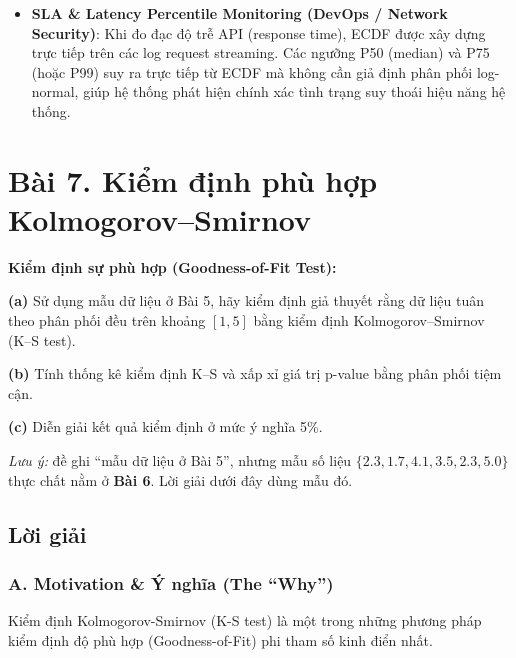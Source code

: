 \documentclass[12pt,a4paper]{article}
\renewenvironment{quote}{\begin{ghichu}}{\end{ghichu}}
\begin{document}
\begin{itemize}

\item
  \textbf{SLA \& Latency Percentile Monitoring (DevOps / Network Security)}: Khi đo đạc độ trễ API (response time), ECDF được xây dựng trực tiếp trên các log request streaming. Các ngưỡng P50 (median) và P75 (hoặc P99) suy ra trực tiếp từ ECDF mà không cần giả định phân phối log-normal, giúp hệ thống phát hiện chính xác tình trạng suy thoái hiệu năng hệ thống.
\end{itemize}

\section{Bài 7. Kiểm định phù hợp Kolmogorov--Smirnov}\label{buxe0i-7.-kiux1ec3m-ux111ux1ecbnh-phuxf9-hux1ee3p-kolmogorovsmirnov}

\begin{debai}

\textbf{Kiểm định sự phù hợp (Goodness-of-Fit Test):}

\textbf{(a)} Sử dụng mẫu dữ liệu ở Bài 5, hãy kiểm định giả thuyết rằng dữ liệu tuân theo phân phối đều trên khoảng \([1, 5]\) bằng kiểm định Kolmogorov--Smirnov (K--S test).

\textbf{(b)} Tính thống kê kiểm định K--S và xấp xỉ giá trị p-value bằng phân phối tiệm cận.

\textbf{(c)} Diễn giải kết quả kiểm định ở mức ý nghĩa 5\%.

\begin{quote}
\emph{Lưu ý:} đề ghi ``mẫu dữ liệu ở Bài 5'', nhưng mẫu số liệu \(\{2.3, 1.7, 4.1, 3.5, 2.3, 5.0\}\) thực chất nằm ở \textbf{Bài 6}. Lời giải dưới đây dùng mẫu đó.
\end{quote}

\end{debai}
\subsection*{Lời giải}

\subsubsection{A. Motivation \& Ý nghĩa (The ``Why'')}\label{a.-motivation-uxfd-nghux129a-the-why-6}

Kiểm định Kolmogorov-Smirnov (K-S test) là một trong những phương pháp kiểm định độ phù hợp (Goodness-of-Fit) phi tham số kinh điển nhất.
\end{document}
